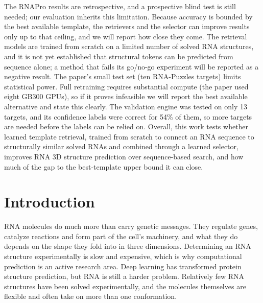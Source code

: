 \documentclass{FastFyp}
\begin{document}
The RNAPro results are retrospective, and a prospective blind test is still needed; our evaluation inherits this limitation. Because accuracy is bounded by the best available template, the retrievers and the selector can improve results only up to that ceiling, and we will report how close they come. The retrieval models are trained from scratch on a limited number of solved RNA structures, and it is not yet established that structural tokens can be predicted from sequence alone; a method that fails its go/no-go experiment will be reported as a negative result. The paper's small test set (ten RNA-Puzzles targets) limits statistical power. Full retraining requires substantial compute (the paper used eight GB300 GPUs), so if it proves infeasible we will report the best available alternative and state this clearly. The validation engine was tested on only 13 targets, and its confidence labels were correct for 54\% of them, so more targets are needed before the labels can be relied on. Overall, this work tests whether learned template retrieval, trained from scratch to connect an RNA sequence to structurally similar solved RNAs and combined through a learned selector, improves RNA 3D structure prediction over sequence-based search, and how much of the gap to the best-template upper bound it can close.

\pagebreak


\pagestyle{fancy} %
\tableofcontents

\pagebreak
\listoffigures	%
\pagebreak
\listoftables %

\mainmatter


\clearpage
\chapter{Introduction}
\label{ch:intro}

RNA molecules do much more than carry genetic messages. They regulate genes, catalyze reactions and form part of the cell's machinery, and what they do depends on the shape they fold into in three dimensions. Determining an RNA structure experimentally is slow and expensive, which is why computational prediction is an active research area. Deep learning has transformed protein structure prediction, but RNA is still a harder problem. Relatively few RNA structures have been solved experimentally, and the molecules themselves are flexible and often take on more than one conformation.
\end{document}
